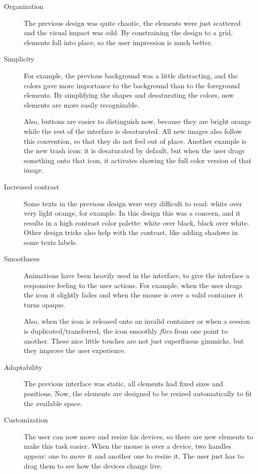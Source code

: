 \begin{description}
  \item[Organization] The previous design was quite chaotic, the elements were just scattered and the visual impact was odd.
  By constraining the design to a grid, elements fall into place, so the user impression is much better.
  \item[Simplicity] For example, the previous background was a little distracting, and the colors gave more importance to the background than to the foreground elements.
  By simplifying the shapes and desaturating the colors, now elements are more easily recognizable.
  
  Also, buttons are easier to distinguish now, because they are bright orange while the rest of the interface is desaturated.
  All new images also follow this convention, so that they do not feel out of place.
  Another example is the new trash icon: it is desaturated by default, but when the user drags something onto that icon, it activates showing the full color version of that image.
  \item[Increased contrast] Some texts in the previous design were very difficult to read: white over very light orange, for example.
  In this design this was a concern, and it results in a high contrast color palette: white over black, black over white.
  Other design tricks also help with the contrast, like adding shadows in some texts labels.
  \item[Smoothness] Animations have been heavily used in the interface, to give the interface a responsive feeling to the user actions.
  For example, when the user drags the icon it slightly fades and when the mouse is over a valid container it turns opaque.
  
  Also, when the icon is released onto an invalid container or when a session is duplicated/transferred, the icon smoothly \emph{flies} from one point to another.
  These nice little touches are not just superfluous gimmicks, but they improve the user experience.
  \item[Adaptability] The previous interface was static, all elements had fixed sizes and positions.
  Now, the elements are designed to be resized automatically to fit the available space.
  \item[Customization] The user can now move and resize his devices, so there are new elements to make this task easier.
  When the mouse is over a device, two handles appear: one to move it and another one to resize it.
  The user just has to drag them to see how the devices change live.
  

\end{description}
